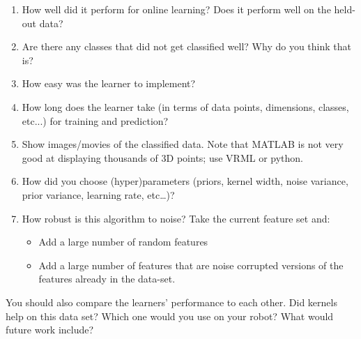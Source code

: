 \documentclass[letterpaper]{article}
\begin{document}
\begin{enumerate}
\item How well did it perform for online learning?  Does it perform well on the held-out data?
\item Are there any classes that did not get classified well?  Why do you think that is?
\item How easy was the learner to implement?
\item How long does the learner take (in terms of data points, dimensions, classes, etc...) for training and prediction?
\item Show images/movies of the classified data.  Note that MATLAB is not very good at displaying thousands of 3D points; use VRML or python.
\item How did you choose (hyper)parameters (priors, kernel width, noise variance, prior variance, learning rate, etc\ldots)?
\item How robust is this algorithm to noise? Take the current feature set and:
  \begin{itemize}
  \item Add a large number of random features
  \item Add a large number of features that are noise corrupted versions of the features already in the data-set.
  \end{itemize}

\end{enumerate}

You should also compare the learners' performance to each other.  Did kernels help on this data set?  Which one would you use on your robot?  What would future work include?
\end{document}
